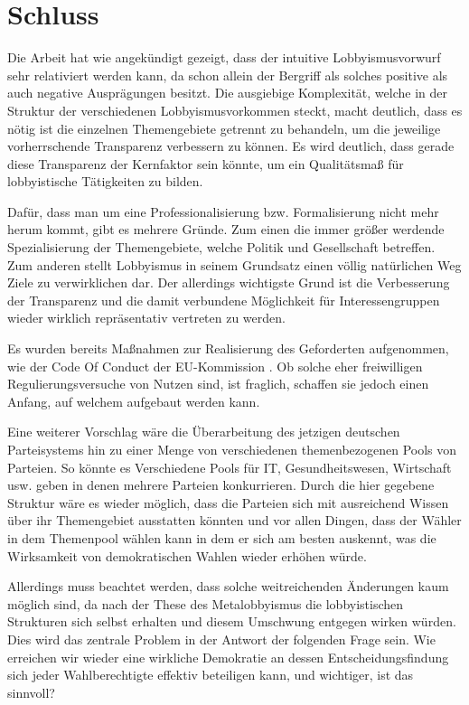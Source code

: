 \section{Schluss}
Die Arbeit hat wie angekündigt gezeigt, dass der intuitive Lobbyismusvorwurf 
sehr relativiert werden kann, da schon allein der Bergriff als solches positive 
als auch negative Ausprägungen besitzt. Die ausgiebige Komplexität, welche in 
der Struktur der verschiedenen Lobbyismusvorkommen steckt, macht deutlich, dass 
es nötig ist die einzelnen Themengebiete getrennt zu behandeln, um die 
jeweilige 
vorherrschende Transparenz verbessern zu können. Es wird deutlich, dass gerade 
diese 
Transparenz der Kernfaktor sein könnte, um ein Qualitätsmaß für lobbyistische 
Tätigkeiten zu bilden.

Dafür, dass man um eine Professionalisierung bzw. Formalisierung nicht mehr 
herum kommt, gibt es mehrere Gründe. Zum einen die immer größer werdende 
Spezialisierung der Themengebiete, welche Politik und Gesellschaft betreffen. 
Zum anderen stellt Lobbyismus in seinem Grundsatz einen völlig natürlichen Weg
Ziele zu verwirklichen dar. Der allerdings wichtigste Grund ist die 
Verbesserung 
der Transparenz und die damit verbundene Möglichkeit für Interessengruppen 
wieder wirklich repräsentativ vertreten zu werden.

Es wurden bereits Maßnahmen zur Realisierung des Geforderten aufgenommen, wie 
\zB der Code Of Conduct der EU-Kommission \cite{EuLobbyCodex}. Ob solche eher 
freiwilligen Regulierungsversuche von Nutzen sind, ist fraglich, schaffen sie 
jedoch einen Anfang, auf welchem aufgebaut werden kann.

Eine weiterer Vorschlag wäre \zB die Überarbeitung des jetzigen deutschen 
Parteisystems hin zu einer Menge von verschiedenen themenbezogenen Pools von 
Parteien. So könnte es Verschiedene Pools für \zB IT, Gesundheitswesen, 
Wirtschaft usw. geben in denen mehrere Parteien konkurrieren. Durch die hier 
gegebene Struktur wäre es wieder möglich, dass die Parteien sich mit 
ausreichend Wissen über ihr Themengebiet ausstatten könnten und vor allen 
Dingen, dass der Wähler in dem Themenpool wählen kann in dem er sich am besten 
auskennt, was die Wirksamkeit von demokratischen Wahlen wieder erhöhen würde.

Allerdings muss beachtet werden, dass solche weitreichenden Änderungen kaum 
möglich sind, da nach der These des Metalobbyismus die lobbyistischen 
Strukturen sich selbst erhalten und diesem Umschwung entgegen wirken würden. 
Dies wird das zentrale Problem in der Antwort der folgenden Frage sein.
Wie erreichen wir wieder eine wirkliche Demokratie an dessen 
Entscheidungsfindung sich jeder Wahlberechtigte effektiv beteiligen kann, und 
wichtiger, ist das sinnvoll?

\newpage
\printbibliography


